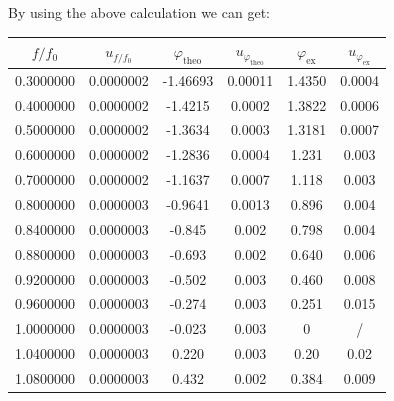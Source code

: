 \documentclass[a4paper]{article}
\begin{document}
By using the above calculation we can get:
\begin{table}[!htbp]
	\centering
	\begin{tabular}{cccccc}
		\hline
		$f/f_0$   & $u_{f/f_0}$ & $\varphi_{\text{theo}}$ & $u_{\varphi_{\text{theo}}}$ & $\varphi_{\text{ex}}$ & $u_{\varphi_{\text{ex}}}$ \\
		\hline
		0.3000000 & 0.0000002   & -1.46693                & 0.00011                     & 1.4350                & 0.0004                    \\
		0.4000000 & 0.0000002   & -1.4215                 & 0.0002                      & 1.3822                & 0.0006                    \\
		0.5000000 & 0.0000002   & -1.3634                 & 0.0003                      & 1.3181                & 0.0007                    \\
		0.6000000 & 0.0000002   & -1.2836                 & 0.0004                      & 1.231                 & 0.003                     \\
		0.7000000 & 0.0000002   & -1.1637                 & 0.0007                      & 1.118                 & 0.003                     \\
		0.8000000 & 0.0000003   & -0.9641                 & 0.0013                      & 0.896                 & 0.004                     \\
		0.8400000 & 0.0000003   & -0.845                  & 0.002                       & 0.798                 & 0.004                     \\
		0.8800000 & 0.0000003   & -0.693                  & 0.002                       & 0.640                 & 0.006                     \\
		0.9200000 & 0.0000003   & -0.502                  & 0.003                       & 0.460                 & 0.008                     \\
		0.9600000 & 0.0000003   & -0.274                  & 0.003                       & 0.251                 & 0.015                     \\
		1.0000000 & 0.0000003   & -0.023                  & 0.003                       & 0                     & /                         \\
		1.0400000 & 0.0000003   & 0.220                   & 0.003                       & 0.20                  & 0.02                      \\
		1.0800000 & 0.0000003   & 0.432                   & 0.002                       & 0.384                 & 0.009                     \\

\end{tabular}
\end{table}
\end{document}
